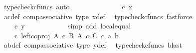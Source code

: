 \begin{isabellebody}
\ {\isacharparenleft}{\kern0pt}typecheck{\isacharunderscore}{\kern0pt}cfuncs{\isacharcomma}{\kern0pt}\ auto{\isacharparenright}{\kern0pt}\isanewline
\ \ \ \ \ \ \ \ \isamarkupfalse%
\ \isamarkupfalse%
\ {\isachardoublequoteopen}{\isachardot}{\kern0pt}{\isachardot}{\kern0pt}{\isachardot}{\kern0pt}\ {\isacharequal}{\kern0pt}\ {\isasymphi}\ {\isasymcirc}\isactrlsub c\ x{\isachardoublequoteclose}\isanewline
\ \ \ \ \ \ \ \ \ \ \isamarkupfalse%
\ ac{\isacharunderscore}{\kern0pt}def\ comp{\isacharunderscore}{\kern0pt}associative{}\ {\isasymphi}{\isacharunderscore}{\kern0pt}type\ x{\isacharprime}{\kern0pt}{\isacharunderscore}{\kern0pt}def\ \isamarkupfalse%
\ {\isacharparenleft}{\kern0pt}typecheck{\isacharunderscore}{\kern0pt}cfuncs{\isacharcomma}{\kern0pt}\ fastforce{\isacharparenright}{\kern0pt}\isanewline
\ \ \ \ \ \ \ \ \isamarkupfalse%
\ \isamarkupfalse%
\ {\isachardoublequoteopen}{\isachardot}{\kern0pt}{\isachardot}{\kern0pt}{\isachardot}{\kern0pt}\ {\isacharequal}{\kern0pt}\ {\isasymphi}\ {\isasymcirc}\isactrlsub c\ y{\isachardoublequoteclose}\isanewline
\ \ \ \ \ \ \ \ \ \ \isamarkupfalse%
\ {\isacharparenleft}{\kern0pt}simp\ add{\isacharcolon}{\kern0pt}\ local{\isachardot}{\kern0pt}equal{\isacharparenright}{\kern0pt}\isanewline
\ \ \ \ \ \ \ \ \isamarkupfalse%
\ \isamarkupfalse%
\ {\isachardoublequoteopen}{\isachardot}{\kern0pt}{\isachardot}{\kern0pt}{\isachardot}{\kern0pt}\ {\isacharequal}{\kern0pt}\ {\isacharparenleft}{\kern0pt}{\isasymphi}\ {\isasymcirc}\isactrlsub c\ left{\isacharunderscore}{\kern0pt}coproj\ {\isacharparenleft}{\kern0pt}A\ {\isasymtimes}\isactrlsub c\ B{\isacharparenright}{\kern0pt}\ {\isacharparenleft}{\kern0pt}A\ {\isasymtimes}\isactrlsub c\ C{\isacharparenright}{\kern0pt}{\isacharparenright}{\kern0pt}\ {\isasymcirc}\isactrlsub c\ {\isasymlangle}a{\isacharprime}{\kern0pt}{\isacharcomma}{\kern0pt}\ b{\isacharprime}{\kern0pt}{\isasymrangle}{\isachardoublequoteclose}\isanewline
\ \ \ \ \ \ \ \ \ \ \isamarkupfalse%
\ a{\isacharprime}{\kern0pt}b{\isacharprime}{\kern0pt}{\isacharunderscore}{\kern0pt}def\ comp{\isacharunderscore}{\kern0pt}associative{}\ {\isasymphi}{\isacharunderscore}{\kern0pt}type\ y{\isacharprime}{\kern0pt}{\isacharunderscore}{\kern0pt}def\ \isamarkupfalse%
\ {\isacharparenleft}{\kern0pt}typecheck{\isacharunderscore}{\kern0pt}cfuncs{\isacharcomma}{\kern0pt}\ blast{\isacharparenright}{\kern0pt}\isanewline
\ \ \ \ \ \ \ \ \ \ \isamarkupfalse%

\end{isabellebody}
